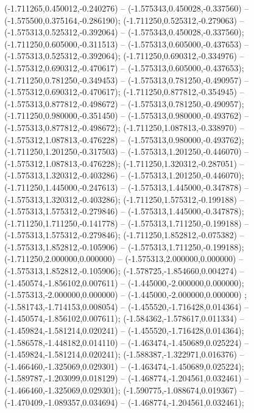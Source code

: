  (-1.711265,0.450012,-0.240276) -- (-1.575343,0.450028,-0.337560) -- (-1.575500,0.375164,-0.286190);
 (-1.711250,0.525312,-0.279063) -- (-1.575313,0.525312,-0.392064) -- (-1.575343,0.450028,-0.337560);
 (-1.711250,0.605000,-0.311513) -- (-1.575313,0.605000,-0.437653) -- (-1.575313,0.525312,-0.392064);
 (-1.711250,0.690312,-0.334976) -- (-1.575312,0.690312,-0.470617) -- (-1.575313,0.605000,-0.437653);
 (-1.711250,0.781250,-0.349453) -- (-1.575313,0.781250,-0.490957) -- (-1.575312,0.690312,-0.470617);
 (-1.711250,0.877812,-0.354945) -- (-1.575313,0.877812,-0.498672) -- (-1.575313,0.781250,-0.490957);
 (-1.711250,0.980000,-0.351450) -- (-1.575313,0.980000,-0.493762) -- (-1.575313,0.877812,-0.498672);
 (-1.711250,1.087813,-0.338970) -- (-1.575312,1.087813,-0.476228) -- (-1.575313,0.980000,-0.493762);
 (-1.711250,1.201250,-0.317503) -- (-1.575313,1.201250,-0.446070) -- (-1.575312,1.087813,-0.476228);
 (-1.711250,1.320312,-0.287051) -- (-1.575313,1.320312,-0.403286) -- (-1.575313,1.201250,-0.446070);
 (-1.711250,1.445000,-0.247613) -- (-1.575313,1.445000,-0.347878) -- (-1.575313,1.320312,-0.403286);
 (-1.711250,1.575312,-0.199188) -- (-1.575313,1.575312,-0.279846) -- (-1.575313,1.445000,-0.347878);
 (-1.711250,1.711250,-0.141778) -- (-1.575313,1.711250,-0.199188) -- (-1.575313,1.575312,-0.279846);
 (-1.711250,1.852812,-0.075382) -- (-1.575313,1.852812,-0.105906) -- (-1.575313,1.711250,-0.199188);
 (-1.711250,2.000000,0.000000) -- (-1.575313,2.000000,0.000000) -- (-1.575313,1.852812,-0.105906);
 (-1.578725,-1.854660,0.004274) -- (-1.450574,-1.856102,0.007611) -- (-1.445000,-2.000000,0.000000);
 (-1.575313,-2.000000,0.000000) -- (-1.445000,-2.000000,0.000000) ;
 (-1.581743,-1.714153,0.008054) -- (-1.455520,-1.716428,0.014364) -- (-1.450574,-1.856102,0.007611);
 (-1.584362,-1.578617,0.011334) -- (-1.459824,-1.581214,0.020241) -- (-1.455520,-1.716428,0.014364);
 (-1.586578,-1.448182,0.014110) -- (-1.463474,-1.450689,0.025224) -- (-1.459824,-1.581214,0.020241);
 (-1.588387,-1.322971,0.016376) -- (-1.466460,-1.325069,0.029301) -- (-1.463474,-1.450689,0.025224);
 (-1.589787,-1.203099,0.018129) -- (-1.468774,-1.204561,0.032461) -- (-1.466460,-1.325069,0.029301);
 (-1.590775,-1.088674,0.019367) -- (-1.470409,-1.089357,0.034694) -- (-1.468774,-1.204561,0.032461);
